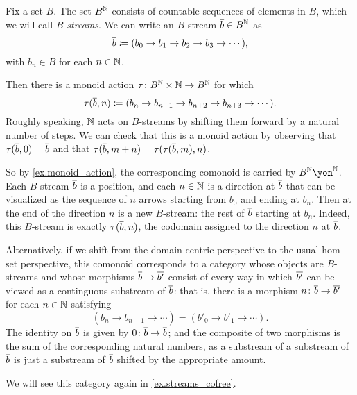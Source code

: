 \documentclass[Book-Poly]{subfiles}
\begin{document}
\begin{example}\label{ex.streams_category}
Fix a set $B$.
The set $B^{\mathbb{N}}$ consists of countable sequences of elements in $B$, which we will call \emph{$B$-streams}.
We can write an $B$-stream $\overline{b}\in B^{\mathbb{N}}$ as
\[
    \overline{b}\coloneqq(b_0\to b_1\to b_2\to b_3\to\cdots),
\]
with $b_n\in B$ for each $n\in\mathbb{N}$.

Then there is a monoid action $\tau\colon B^{\mathbb{N}}\times\mathbb{N}\to B^{\mathbb{N}}$ for which
\[
    \tau(\overline{b},n)\coloneqq(b_n\to b_{n+1}\to b_{n+2}\to b_{n+3}\to\cdots).
\]
Roughly speaking, $\mathbb{N}$ acts on $B$-streams by shifting them forward by a natural number of steps.
We can check that this is a monoid action by observing that $\tau(\overline{b},0)=\overline{b}$ and that $\tau(\overline{b},m+n)=\tau(\tau(\overline{b},m),n)$.

So by \cref{ex.monoid_action}, the corresponding comonoid is carried by $B^\nn\yon^\nn$.
Each $B$-stream $\overline{b}$ is a position, and each $n\in\mathbb{N}$ is a direction at $\overline{b}$ that can be visualized as the sequence of $n$ arrows starting from $b_0$ and ending at $b_n$.
Then at the end of the direction $n$ is a new $B$-stream: the rest of $\overline{b}$ starting at $b_n$.
Indeed, this $B$-stream is exactly $\tau(\overline{b},n)$, the codomain assigned to the direction $n$ at $\overline{b}$.

Alternatively, if we shift from the domain-centric perspective to the usual hom-set perspective, this comonoid corresponds to a category whose objects are $B$-streams and whose morphisms $\overline{b}\to\overline{b'}$ consist of every way in which $\overline{b'}$ can be viewed as a continguous substream of $\overline{b}$: that is, there is a morphism $n\colon\overline{b}\to\overline{b'}$ for each $n\in\mathbb{N}$ satisfying
\[
    (b_n\to b_{n+1}\to\cdots)=(b'_0\to b'_1\to\cdots).
\]
The identity on $\overline{b}$ is given by $0\colon\overline{b}\to\overline{b}$; and the composite of two morphisms is the sum of the corresponding natural numbers, as a substream of a substream of $\overline{b}$ is just a substream of $\overline{b}$ shifted by the appropriate amount.

We will see this category again in \cref{ex.streams_cofree}.
\end{example}

\end{document}
